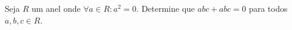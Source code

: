 Seja \(R\) um anel onde \(\forall a\in R: a^2=0\). Determine que \(abc+abc=0\) para todos \(a,b,c\in R\).
